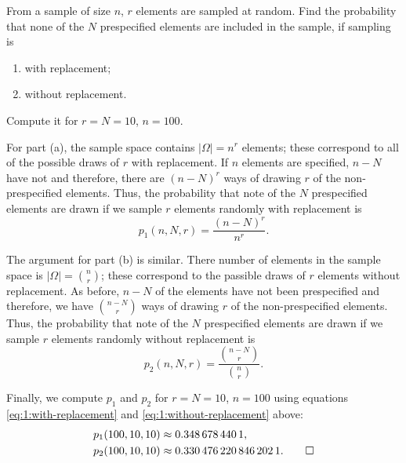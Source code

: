 \begin{problem}[Handout 1, \# 9]
  From a sample of size \(n\), \(r\) elements are sampled at random. Find
  the probability that none of the \(N\) prespecified elements are included
  in the sample, if sampling is
  \begin{enumerate}[label=(\alph*),noitemsep]
  \item with replacement;
  \item without replacement.
  \end{enumerate}
  Compute it for \(r=N=10\), \(n=100\).
\end{problem}
\begin{solution*}
  For part (a), the sample space contains \(|\Omega|=n^r\) elements; these
  correspond to all of the possible draws of \(r\) with replacement. If
  \(n\) elements are specified, \(n-N\) have not and therefore, there are
  \((n-N)^r\) ways of drawing \(r\) of the non-prespecified elements. Thus,
  the probability that note of the \(N\) prespecified elements are drawn if
  we sample \(r\) elements randomly with replacement is
  \begin{equation}
    \label{eq:1:with-replacement}
    p_1(n,N,r)=\frac{(n-N)^r}{n^r}.
  \end{equation}

  The argument for part (b) is similar. There number of elements in the
  sample space is \(|\Omega|=\binom{n}{r}\); these correspond to the
  passible draws of \(r\) elements without replacement. As before, \(n-N\)
  of the elements have not been prespecified and therefore, we have
  \(\binom{n-N}{r}\) ways of drawing \(r\) of the non-prespecified
  elements. Thus, the probability that note of the \(N\) prespecified
  elements are drawn if we sample \(r\) elements randomly without
  replacement is
  \begin{equation}
    \label{eq:1:without-replacement}
    p_2(n,N,r)=\frac{\binom{n-N}{r}}{\binom{n}{r}}.
  \end{equation}

  Finally, we compute \(p_1\) and \(p_2\) for \(r=N=10\), \(n=100\) using
  equations \eqref{eq:1:with-replacement} and
  \eqref{eq:1:without-replacement} above:
  \begin{align*}
    p_1(100,10,10)&\approx\num{0.3486784401},\\
    p_2(100,10,10)&\approx\num{0.3304762208462021}.\qedhere
  \end{align*}
\end{solution*}

